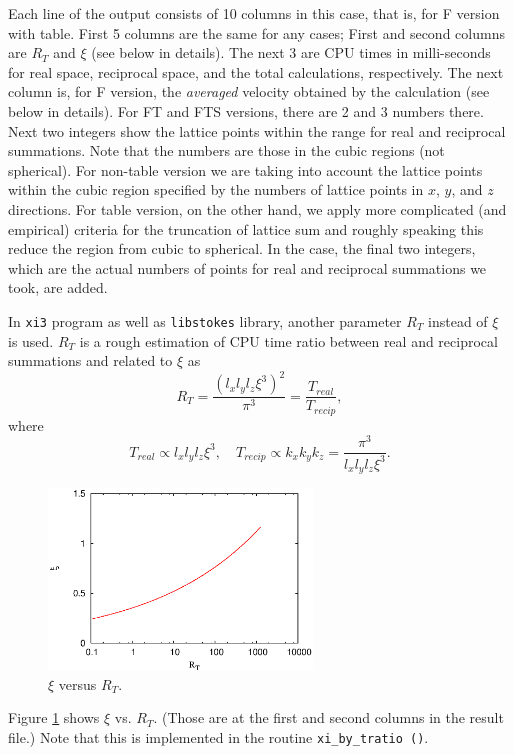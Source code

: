 \documentclass{book}
\begin{document}
Each line of the output consists of 10 columns in this case,
that is, for F version with table.
First 5 columns are the same for any cases;
First and second columns are $R_T$ and $\xi$ (see below in details).
The next 3 are CPU times in milli-seconds
for real space, reciprocal space, and the total
calculations, respectively.
The next column is, for F version, the {\it averaged} velocity
obtained by the calculation (see below in details).
For FT and FTS versions, there are 2 and 3 numbers there.
Next two integers show the lattice points within the range
for real and reciprocal summations. Note that the numbers 
are those in the cubic regions (not spherical). For non-table version
we are taking into account the lattice points within the cubic region
specified by the numbers of lattice points in $x$, $y$, and $z$ directions.
For table version, on the other hand, we apply more complicated 
(and empirical) criteria for the truncation of lattice sum and
roughly speaking this reduce the region from cubic to spherical.
In the case, the final two integers, which are the actual numbers 
of points for real and reciprocal summations we took, are added.



In {\tt xi3} program as well as {\tt libstokes}
library, another parameter $R_T$ instead of $\xi$ is used.
$R_T$ is a rough estimation of CPU time ratio between real and reciprocal
summations and related to $\xi$ as
\begin{equation}
  R_T
  =
  \frac{
    \left(
      l_x l_y l_z
      \xi^3
    \right)^2
  }{\pi^3}   
  =
  \frac{T_{real}}{T_{recip}}
  ,
\end{equation}
where
\begin{equation}
  T_{real}
  \propto
  l_x l_y l_z
  \xi^3
  ,
  \quad
  T_{recip}
  \propto
  k_x k_y k_z
  =
  \frac{\pi^3}{l_x l_y l_z \xi^3}
  .
\end{equation}
\begin{figure}
  \centering
  \includegraphics[width=7cm]{figures/FIG-xi3-xi}
  \caption{
    $\xi$ versus $R_T$.
  }
  \label{fig:xi3-xi}
\end{figure}
Figure \ref{fig:xi3-xi} shows $\xi$ vs. $R_T$.
(Those are at the first and second columns in the result file.)
Note that this is implemented in the routine
{\tt xi\_by\_tratio ()}.
\end{document}
